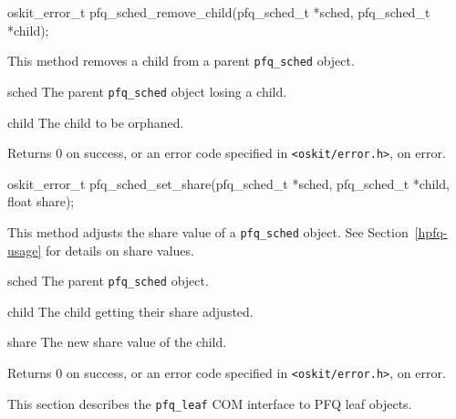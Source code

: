 \begin{apisyn}

	\funcproto oskit_error_t pfq_sched_remove_child(pfq_sched_t *sched,
				pfq_sched_t *child);
\end{apisyn}
\begin{apidesc}
	This method removes a child from a parent \texttt{pfq_sched} object.
\end{apidesc}
\begin{apiparm}
	\item[sched]
		The parent \texttt{pfq_sched} object losing a child.
	\item[child]
		The child to be orphaned.
\end{apiparm}
\begin{apiret}
	Returns 0 on success, or an error code specified in
	\texttt{<oskit/error.h>}, on error.
\end{apiret}

\begin{apisyn}

	\funcproto oskit_error_t pfq_sched_set_share(pfq_sched_t *sched,
				pfq_sched_t *child,
				float share);
\end{apisyn}
\begin{apidesc}
	This method adjusts the share value of a \texttt{pfq_sched} object.
	See Section~\ref{hpfq-usage} for details on share values.
\end{apidesc}
\begin{apiparm}
	\item[sched]
		The parent \texttt{pfq_sched} object.
	\item[child]
		The child getting their share adjusted.
	\item[share]
		The new share value of the child.
\end{apiparm}
\begin{apiret}
	Returns 0 on success, or an error code specified in
	\texttt{<oskit/error.h>}, on error.
\end{apiret}



This section describes the \texttt{pfq_leaf} COM interface to PFQ
leaf objects.

